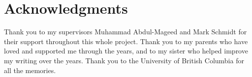 
\chapter{Acknowledgments}




Thank you to my supervisors Muhammad Abdul-Mageed and Mark Schmidt for their support throughout this whole project. Thank you to my parents who have loved and supported me through the years, and to my sister who helped improve my writing over the years. Thank you to the University of British Columbia for all the memories. 